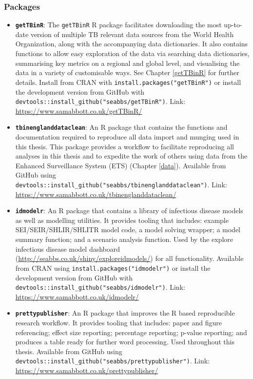 \documentclass[11pt,twoside]{bristolthesis}
\begin{document}
  \hypertarget{packages}{%
  \subsubsection{Packages}\label{packages}}
  \begin{itemize}
  \item
    \textbf{\texttt{getTBinR}}: The \texttt{getTBinR} R package facilitates downloading the most up-to-date version of multiple TB relevant data sources from the World Health Organization, along with the accompanying data dictionaries. It also contains functions to allow easy exploration of the data via searching data dictionaries, summarising key metrics on a regional and global level, and visualising the data in a variety of customisable ways. See Chapter \ref{getTBinR} for further details. Install from CRAN with \texttt{install.packages("getTBinR")} or install the development version from GitHub with \texttt{devtools::install\_github("seabbs/getTBinR")}. Link: \url{https://www.samabbott.co.uk/getTBinR/}
  \item
    \textbf{\texttt{tbinenglanddataclean}}: An R package that contains the functions and documentation required to reproduce all data import and munging used in this thesis. This package provides a workflow to facilitate reproducing all analyses in this thesis and to expedite the work of others using data from the Enhanced Surveillance System (ETS) (Chapter \ref{data}). Available from GitHub using \texttt{devtools::install\_github("seabbs/tbinenglanddataclean")}. Link: \url{https://www.samabbott.co.uk/tbinenglanddataclean/}
  \item
    \textbf{\texttt{idmodelr}}: An R package that contains a library of infectious disease models as well as modelling utilities. It provides tooling that includes: example SEI/SEIR/SHLIR/SHLITR model code, a model solving wrapper; a model summary function; and a scenario analysis function. Used by the explore infectious disease model dashboard (\url{http://seabbs.co.uk/shiny/exploreidmodels/}) for all functionality. Available from CRAN using \texttt{install.packages("idmodelr")} or install the development version from GitHub with \texttt{devtools::install\_github("seabbs/idmodelr")}. Link: \url{https://www.samabbott.co.uk/idmodelr/}
  \item
    \textbf{\texttt{prettypublisher}}: An R package that improves the R based reproducible research workflow. It provides tooling that includes: paper and figure referencing; effect size reporting; percentage reporting; p-value reporting; and produces a table ready for further word processing. Used throughout this thesis. Available from GitHub using \texttt{devtools::install\_github("seabbs/prettypublisher")}. Link: \url{https://www.samabbott.co.uk/prettypublisher/}
  \end{itemize}
\end{document}
